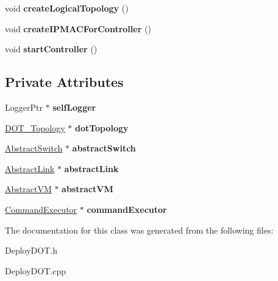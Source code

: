 \begin{DoxyCompactItemize}
\item 
\hypertarget{classDeployDOT_a987410f400baed2c6cd40d2f712997d8}{void {\bfseries create\-Logical\-Topology} ()}\label{classDeployDOT_a987410f400baed2c6cd40d2f712997d8}

\item 
\hypertarget{classDeployDOT_a59d10091732fc9bb62efa078d43e2601}{void {\bfseries create\-I\-P\-M\-A\-C\-For\-Controller} ()}\label{classDeployDOT_a59d10091732fc9bb62efa078d43e2601}

\item 
\hypertarget{classDeployDOT_a7cc0f0b07e3d6b7f460692981d907a91}{void {\bfseries start\-Controller} ()}\label{classDeployDOT_a7cc0f0b07e3d6b7f460692981d907a91}

\end{DoxyCompactItemize}
\subsection*{\-Private \-Attributes}
\begin{DoxyCompactItemize}
\item 
\hypertarget{classDeployDOT_a5e27a12da51c695bb26e46390766f559}{\-Logger\-Ptr $\ast$ {\bfseries self\-Logger}}\label{classDeployDOT_a5e27a12da51c695bb26e46390766f559}

\item 
\hypertarget{classDeployDOT_acd16f9cee0c9c8f84514d7de21d68dce}{\hyperlink{classDOT__Topology}{\-D\-O\-T\-\_\-\-Topology} $\ast$ {\bfseries dot\-Topology}}\label{classDeployDOT_acd16f9cee0c9c8f84514d7de21d68dce}

\item 
\hypertarget{classDeployDOT_a53d0215a29fcf48beefccde2210ec2db}{\hyperlink{classAbstractSwitch}{\-Abstract\-Switch} $\ast$ {\bfseries abstract\-Switch}}\label{classDeployDOT_a53d0215a29fcf48beefccde2210ec2db}

\item 
\hypertarget{classDeployDOT_ac716d7772451a3978810e0d3cb62be4e}{\hyperlink{classAbstractLink}{\-Abstract\-Link} $\ast$ {\bfseries abstract\-Link}}\label{classDeployDOT_ac716d7772451a3978810e0d3cb62be4e}

\item 
\hypertarget{classDeployDOT_afde1ace54e90c2ce790ef7b756b3e041}{\hyperlink{classAbstractVM}{\-Abstract\-V\-M} $\ast$ {\bfseries abstract\-V\-M}}\label{classDeployDOT_afde1ace54e90c2ce790ef7b756b3e041}

\item 
\hypertarget{classDeployDOT_a5b1cd8c6035015edfc29dc19583f1ac0}{\hyperlink{classCommandExecutor}{\-Command\-Executor} $\ast$ {\bfseries command\-Executor}}\label{classDeployDOT_a5b1cd8c6035015edfc29dc19583f1ac0}

\end{DoxyCompactItemize}


\-The documentation for this class was generated from the following files\-:\begin{DoxyCompactItemize}
\item 
\-Deploy\-D\-O\-T.\-h\item 
\-Deploy\-D\-O\-T.\-cpp\end{DoxyCompactItemize}
